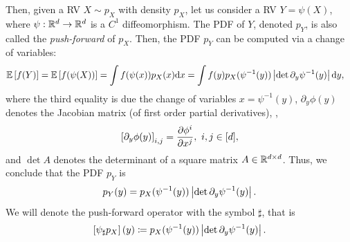 \documentclass{fairmeta}
\numberwithin{equation}{section}
\begin{document}
Then, given a RV $X\sim p_X$ with density $p_X$, let us consider a RV $Y=\psi(X)$, where $\psi:\mathbb R^d\rightarrow\mathbb R^d$ is a $C^1$ diffeomorphism.
The PDF of $Y$, denoted $p_Y$, is also called the \emph{push-forward} of $p_X$.
Then, the PDF $p_Y$ can be computed via a change of variables:
\begin{align*}
\mathbb{E}\left [f(Y)\right ] = \mathbb{E}\left [f(\psi(X))\right ] &= \int f(\psi(x)) p_X(x) \mathrm{d} x = \int f(y) p_X(\psi^{-1}(y)) \left\vert\det \partial_y \psi^{-1} (y)\right\vert \mathrm{d} y,
\end{align*} 
where the third equality is due the change of variables $x=\psi^{-1}(y)$, $\partial_y \phi(y)$ denotes the Jacobian matrix (of first order partial derivatives), \ie, 
\begin{equation*}
 \left [\partial_y \phi(y)\right ]_{i,j} = \frac{\partial \phi^i}{\partial x^j}, \ i,j \in [d],
\end{equation*}
and $\det A$ denotes the determinant of a square matrix $A\in\mathbb R^{d\times d}$. 
Thus, we conclude that the PDF $p_Y$ is
\begin{equation}
    p_Y(y) = p_X(\psi^{-1}(y))\left\vert\det \partial_y \psi^{-1} (y)\right\vert.
\end{equation}
We will denote the push-forward operator with the symbol $\sharp$, that is 
\begin{equation}\label{e:push-forward_p}
     \left [\psi_\sharp  p_X\right ](y) \coloneqq p_X(\psi^{-1}(y))\left\vert\det \partial_y \psi^{-1} (y)\right\vert.
\end{equation}
\end{document}
